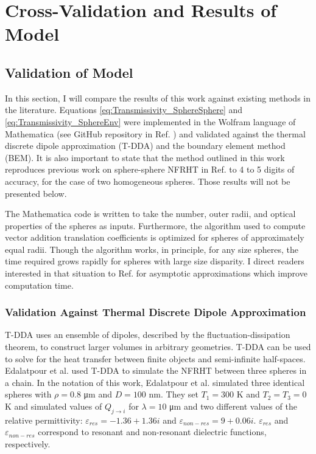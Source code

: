 \chapter[Cross-Validation and Results of Model][Cross-Validation and Results of Model]{Cross-Validation and Results of Model} \label{ch:results}

\section{Validation of Model}
%
In this section, I will compare the results of this work against existing methods in the literature. Equations \ref{eq:Transmissivity_SphereSphere} and \ref{eq:Transmissivity_SphereEnv} were implemented in the Wolfram language of Mathematica \cite{Wolfram2016} (see GitHub repository in Ref. ) and validated against the thermal discrete dipole approximation (T-DDA) and the boundary element method (BEM). It is also important to state that the method outlined in this work reproduces previous work on sphere-sphere NFRHT in Ref.  to 4 to 5 digits of accuracy, for the case of two homogeneous spheres. Those results will not be presented below.

The Mathematica code is written to take the number, outer radii, and optical properties of the spheres as inputs. Furthermore, the algorithm used to compute vector addition translation coefficients is optimized for spheres of approximately equal radii. Though the algorithm works, in principle, for any size spheres, the time required grows rapidly for spheres with large size disparity. I direct readers interested in that situation to Ref.  for asymptotic approximations which improve computation time.

\subsection{Validation Against Thermal Discrete Dipole Approximation}
%
T-DDA \cite{Edalatpour2014, Edalatpour2015, Edalatpour2016} uses an ensemble of dipoles, described by the fluctuation-dissipation theorem, to construct larger volumes in arbitrary geometries. T-DDA can be used to solve for the heat transfer between finite objects and semi-infinite half-spaces. Edalatpour et al. \cite{Edalatpour2016a} used T-DDA to simulate the NFRHT between three spheres in a chain.  In the notation of this work, Edalatpour et al. simulated three identical spheres with $\rho=0.8$ \si{\micro\meter} and $D = 100$ \si{\nano\meter}. They set $T_{1} = 300$ K and $T_{2}=T_{3} = 0$ K and simulated values of $Q_{j \rightarrow i}$ for $\lambda = 10$ \si{\micro\meter} and two different values of the relative permittivity: $\varepsilon_{res} = -1.36+1.36i$ and $\varepsilon_{non-res} = 9+0.06i$. $\varepsilon_{res}$ and $\varepsilon_{non-res}$ correspond to resonant and non-resonant dielectric functions, respectively.

